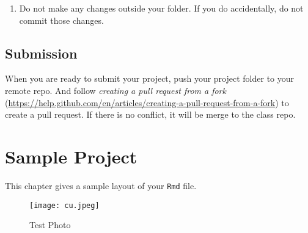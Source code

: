 \documentclass[]{book}
\providecommand{\tightlist}{%
  \setlength{\itemsep}{0pt}\setlength{\parskip}{0pt}}
\begin{document}
\begin{enumerate}
\def\labelenumi{\arabic{enumi}.}
\setcounter{enumi}{1}
\tightlist
\item
  Do not make any changes outside your folder. If you do accidentally, do not commit those changes.
\end{enumerate}

\hypertarget{submission}{%
\section{Submission}\label{submission}}

When you are ready to submit your project, push your project folder to your remote repo. And follow \emph{creating a pull request from a fork} (\url{https://help.github.com/en/articles/creating-a-pull-request-from-a-fork}) to create a pull request. If there is no conflict, it will be merge to the class repo.

\hypertarget{sample-project}{%
\chapter{Sample Project}\label{sample-project}}

This chapter gives a sample layout of your \texttt{Rmd} file.

\begin{figure}
\centering
\texttt{[image: cu.jpeg]}
\caption{Test Photo}
\end{figure}
\end{document}
